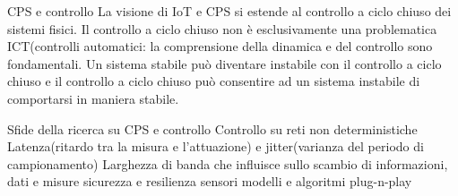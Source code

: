 \documentclass[10pt,a4paper]{article}
\begin{document}
CPS e controllo
La visione di IoT e CPS si estende al controllo a ciclo chiuso dei sistemi fisici.
Il controllo a ciclo chiuso non è esclusivamente una problematica ICT(controlli automatici: la comprensione della dinamica e del controllo sono fondamentali.
Un sistema stabile può diventare instabile con il controllo a ciclo chiuso e il controllo a ciclo chiuso può consentire ad un sistema instabile di comportarsi in maniera stabile.


Sfide della ricerca su CPS e controllo
Controllo su reti non deterministiche
Latenza(ritardo tra la misura e l'attuazione) e jitter(varianza del periodo di campionamento)
Larghezza di banda che influisce sullo scambio di informazioni, dati e misure
sicurezza e resilienza
sensori modelli e algoritmi plug-n-play
\end{document}
